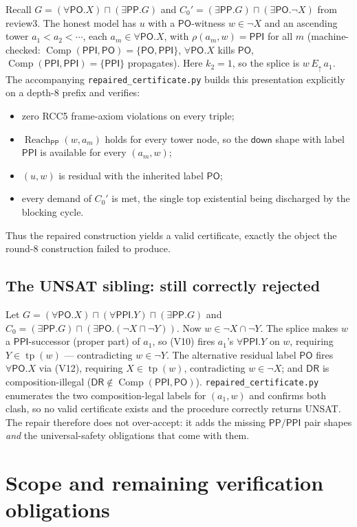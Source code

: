 \documentclass[11pt]{article}
\newcommand{\DR}{\mathsf{DR}}
\newcommand{\PO}{\mathsf{PO}}
\newcommand{\PP}{\mathsf{PP}}
\newcommand{\PPI}{\mathsf{PPI}}
\newcommand{\comp}{\operatorname{Comp}}
\newcommand{\reach}{\operatorname{Reach}}
\newcommand{\tp}{\operatorname{tp}}
\newcommand{\Eup}{E_{\uparrow}}
\newcommand{\down}{\mathsf{down}}
\begin{document}
Recall $G=(\forall\PO.X)\sqcap(\exists\PP.G)$ and
$C_0'=(\exists\PP.G)\sqcap(\exists\PO.\neg X)$ from review3.  The honest model
has $u$ with a $\PO$-witness $w\in\neg X$ and an ascending tower
$a_1<a_2<\cdots$, each $a_m\in\forall\PO.X$, with $\rho(a_m,w)=\PPI$ for all $m$
(machine-checked: $\comp(\PPI,\PO)=\{\PO,\PPI\}$, $\forall\PO.X$ kills $\PO$,
$\comp(\PPI,\PPI)=\{\PPI\}$ propagates).  Here $k_2=1$, so the splice is
$w\,\Eup\,a_1$.  The accompanying \texttt{repaired\_certificate.py} builds this
presentation explicitly on a depth-$8$ prefix and verifies:
\begin{itemize}
\item zero RCC5 frame-axiom violations on every triple;
\item $\reach_\PP(w,a_m)$ holds for every tower node, so the $\down$ shape with
label $\PPI$ is available for every $(a_m,w)$;
\item $(u,w)$ is residual with the inherited label $\PO$;
\item every demand of $C_0'$ is met, the single top existential being discharged
by the blocking cycle.
\end{itemize}
Thus the repaired construction yields a valid certificate, exactly the object the
round-8 construction failed to produce.

\subsection{The UNSAT sibling: still correctly rejected}

Let $G=(\forall\PO.X)\sqcap(\forall\PPI.Y)\sqcap(\exists\PP.G)$ and
$C_0=(\exists\PP.G)\sqcap(\exists\PO.(\neg X\sqcap\neg Y))$.  Now $w\in\neg X\cap
\neg Y$.  The splice makes $w$ a $\PPI$-successor (proper part) of $a_1$, so
(V10) fires $a_1$'s $\forall\PPI.Y$ on $w$, requiring $Y\in\tp(w)$ ---
contradicting $w\in\neg Y$.  The alternative residual label $\PO$ fires
$\forall\PO.X$ via (V12), requiring $X\in\tp(w)$, contradicting $w\in\neg X$;
and $\DR$ is composition-illegal ($\DR\notin\comp(\PPI,\PO)$).
\texttt{repaired\_certificate.py} enumerates the two composition-legal labels for
$(a_1,w)$ and confirms both clash, so no valid certificate exists and the
procedure correctly returns UNSAT.  The repair therefore does not over-accept:
it adds the missing $\PP/\PPI$ pair shapes \emph{and} the universal-safety
obligations that come with them.

\section{Scope and remaining verification obligations}
\end{document}
